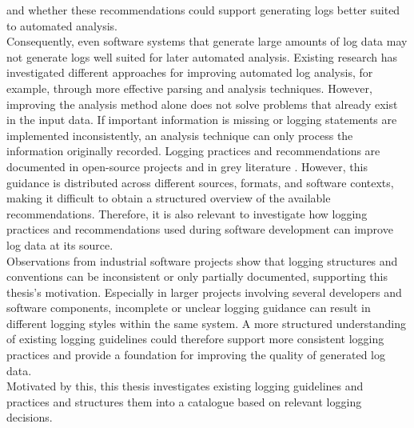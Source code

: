 and whether these recommendations could support generating logs better suited to automated analysis. 
\\
Consequently, even software systems that generate large amounts of log data may not generate logs well suited for later automated analysis.
Existing research has investigated different approaches for improving automated log analysis,
for example, through more effective parsing and analysis techniques.
However, improving the analysis method alone does not solve problems that already exist in the input data.
If important information is missing or logging statements are implemented inconsistently,
an analysis technique can only process the information originally recorded.
Logging practices and recommendations are documented in open-source projects \cite{yuan2012characterzingloggingpractices} and in grey literature \cite{url_medium_logging_best_practices_2022,url_loggly_logging_scale_2022}.
However, this guidance is distributed across different sources, 
formats, and software contexts, making it difficult to obtain a structured overview of the available recommendations. 
Therefore, it is also relevant to investigate how logging practices and recommendations used during software development
can improve log data at its source.
\\
Observations from industrial software projects show that
logging structures and conventions can be inconsistent or only partially documented,
supporting this thesis's motivation.
Especially in larger projects involving several developers and software components, incomplete
or unclear logging guidance can result in different logging styles within the same system.
A more structured understanding of existing logging guidelines could therefore support more consistent logging practices
and provide a foundation for improving the quality of generated log data.
\\
Motivated by this, this thesis investigates existing logging guidelines and practices
and structures them into a catalogue based on relevant logging decisions.

